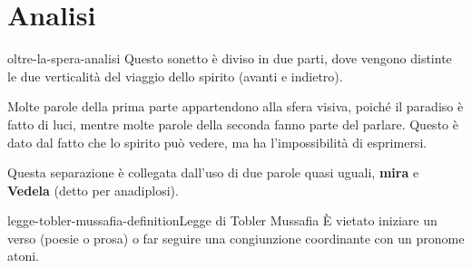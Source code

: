 \documentclass[preview]{standalone}
\begin{document}
\section{Analisi}

\begin{snippet}{oltre-la-spera-analisi}
    Questo sonetto è diviso in due parti, dove vengono distinte le due verticalità del viaggio dello spirito
    (avanti e indietro).
    
    Molte parole della prima parte appartendono alla sfera visiva, poiché il paradiso
    è fatto di luci, mentre molte parole della seconda fanno parte del parlare.
    Questo è dato dal fatto che lo spirito può vedere, ma ha l'impossibilità di esprimersi.
    
    Questa separazione è collegata dall'uso di due parole quasi uguali,
    \textbf{mira} e \textbf{Vedela} (detto per anadiplosi).
\end{snippet}


\begin{snippetdefinition}{legge-tobler-mussafia-definition}{Legge di Tobler Mussafia}
    È vietato iniziare un verso (poesie o prosa) o far seguire una congiunzione coordinante
    con un pronome atoni.
\end{snippetdefinition}
\end{document}
